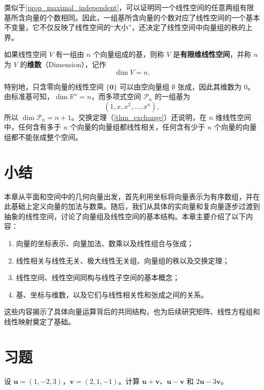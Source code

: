类似于\cref{prop_maximal_independent}，可以证明同一个线性空间的任意两组有限基所含向量的个数相同。因此，一组基所含向量的个数对应了线性空间的一个基本不变量，它不仅反映了线性空间的``大小''，还决定了线性空间中向量组的秩的上界。
\begin{definition}[维数]
    \label{def_dimension}
    如果线性空间 \(V\) 有一组由 \(n\) 个向量组成的基，则称 \(V\) 是\textbf{有限维线性空间}，并称 \(n\) 为 \(V\) 的\textbf{维数}（Dimension），记作
    \[
        \dim V=n.
    \]
\end{definition}

特别地，只含零向量的线性空间 \(\{\bm 0\}\) 可以由空向量组 \(\emptyset\) 张成，因此其维数为 \(0\)。由标准基可知，\(\dim\mathbb R^n=n\)，而多项式空间 \(\mathcal P_n\) 的一组基为
\[
    (1,x,x^2,\ldots,x^n),
\]
所以 \(\dim\mathcal P_n=n+1\)。交换定理（\cref{thm_exchange}）还说明，在 \(n\) 维线性空间中，任何含有多于 \(n\) 个向量的向量组都线性相关，任何含有少于 \(n\) 个向量的向量组都不能张成整个空间。

\section{小结}
\label{sec_vector_summary}

本章从平面和空间中的几何向量出发，首先利用坐标将向量表示为有序数组，并在此基础上定义向量的加法与数乘。随后，我们从具体的实向量和复向量逐步过渡到抽象的线性空间，讨论了向量组及线性空间的基本结构。本章主要介绍了以下内容：

\begin{enumerate}
    \item 向量的坐标表示、向量加法、数乘以及线性组合与张成；
    \item 线性相关与线性无关、极大线性无关组、向量组的秩以及交换定理；
    \item 线性空间、线性空间同构与线性子空间的基本概念；
    \item 基、坐标与维数，以及它们与线性相关性和张成之间的关系。
\end{enumerate}

这些内容揭示了具体向量运算背后的共同结构，也为后续研究矩阵、线性方程组和线性映射奠定了基础。

\section{习题}
\label{sec_vector_exercises}

\begin{exercise}
    \label{exer_vector_1}
    设 \(\bm u=(1,-2,3)\)，\(\bm v=(2,1,-1)\)。计算 \(\bm u+\bm v\)、\(\bm u-\bm v\) 和 \(2\bm u-3\bm v\)。
\end{exercise}

